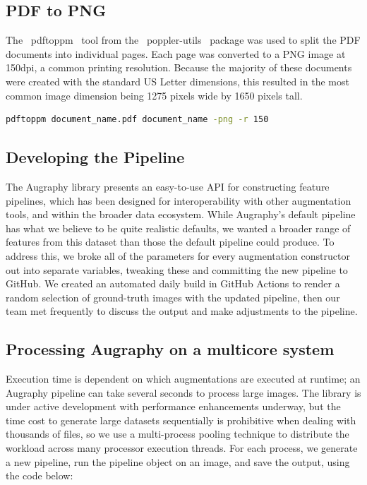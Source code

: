 \documentclass[runningheads]{llncs}
\begin{document}
\subsection{PDF to PNG}
The ~pdftoppm~ tool from the ~poppler-utils~ package was used to split the PDF documents into individual pages. Each page was converted to a PNG image at 150dpi, a common printing resolution. Because the majority of these documents were created with the standard US Letter dimensions, this resulted in the most common image dimension being 1275 pixels wide by 1650 pixels tall.

\begin{lstlisting}[language=bash]
  pdftoppm document_name.pdf document_name -png -r 150
\end{lstlisting}

\subsection{Developing the Pipeline}
The Augraphy library presents an easy-to-use API for constructing feature pipelines, which has been designed for interoperability with other augmentation tools, and within the broader data ecosystem. While Augraphy's default pipeline has what we believe to be quite realistic defaults, we wanted a broader range of features from this dataset than those the default pipeline could produce. To address this, we broke all of the parameters for every augmentation constructor out into separate variables, tweaking these and committing the new pipeline to GitHub. We created an automated daily build in GitHub Actions to render a random selection of ground-truth images with the updated pipeline, then our team met frequently to discuss the output and make adjustments to the pipeline.

\subsection{Processing Augraphy on a multicore system}
Execution time is dependent on which augmentations are executed at runtime; an Augraphy pipeline can take several seconds to process large images. The library is under active development with performance enhancements underway, but the time cost to generate large datasets sequentially is prohibitive when dealing with thousands of files, so we use a multi-process pooling technique to distribute the workload across many processor execution threads. For each process, we generate a new pipeline, run the pipeline object on an image, and save the output, using the code below:
\end{document}
